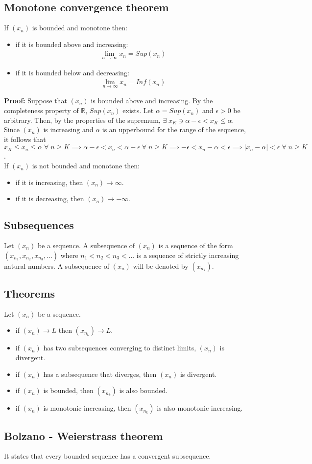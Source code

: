 \documentclass[12pt, a4paper]{article}
\newcommand{\real}{\mathbb{R}}
\newcommand{\all}{\; \forall \;}
\begin{document}
\subsection{Monotone convergence theorem}
If $(x_n)$ is bounded and monotone then:
\begin{itemize}
  \item if it is bounded above and increasing: 
    \begin{gather*}
      \lim_{n \to \infty} x_n = Sup(x_n)
  \end{gather*}
  \item if it is bounded below and decreasing: 
    \begin{gather*}
      \lim_{n \to \infty} x_n = Inf(x_n)
    \end{gather*}
\end{itemize}

\textbf{Proof:} Suppose that $(x_n)$ is bounded above and increasing. 
By the completeness property of $\real$, $Sup(x_n)$ exists. Let $\alpha = Sup(x_n)$
and $\epsilon > 0$ be arbitrary. Then, by the properties of the supremum,
$\exists \; x_K \ni \alpha - \epsilon < x_K \leq \alpha$. Since $(x_n)$
is increasing and $\alpha$ is an upperbound for the range of the sequence,
it follows that $x_K \leq x_n \leq \alpha \all n \geq K \implies
\alpha - \epsilon < x_n < \alpha + \epsilon \all n \geq K \implies 
-\epsilon < x_n - \alpha < \epsilon \implies |x_n - \alpha| < \epsilon
\all n \geq K$.\\

If $(x_n)$ is not bounded and monotone then:
\begin{itemize}
  \item if it is increasing, then $(x_n) \to \infty$.
  \item if it is decreasing, then $(x_n) \to -\infty$.
\end{itemize}

\subsection{Subsequences}
Let $(x_n)$ be a sequence. A subsequence of $(x_n)$ is a sequence of the
form $(x_{n_1}, x_{n_2}, x_{n_3}, ...)$ where $n_1 < n_2 < n_3 < ...$ is
a sequence of strictly increasing natural numbers. A subsequence of $(x_n)$
will be denoted by $(x_{n_k})$.

\subsection{Theorems}
Let $(x_n)$ be a sequence.
\begin{itemize}
  \item if $(x_n) \to L$ then $(x_{n_k}) \to L$.
  \item if $(x_n)$ has two subsequences converging to distinct limits,
    $(x_n)$ is divergent.
  \item if $(x_n)$ has a subsequence that diverges, then $(x_n)$ is divergent.
  \item if $(x_n)$ is bounded, then $(x_{n_k})$ is also bounded.
  \item if $(x_n)$ is monotonic increasing, then $(x_{n_k})$ is also monotonic
    increasing.
\end{itemize}

\subsection{Bolzano - Weierstrass theorem}
It states that every bounded sequence has a convergent subsequence.
\end{document}
